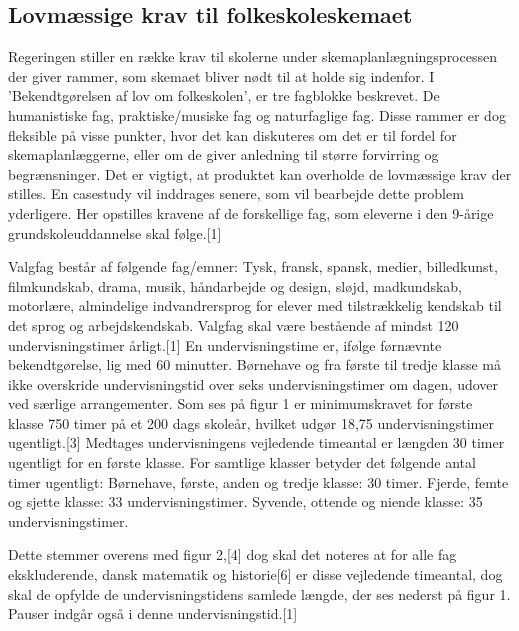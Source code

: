 \subsection{Lovmæssige krav til folkeskoleskemaet}
Regeringen stiller en række krav til skolerne under skemaplanlægningsprocessen der giver rammer, som skemaet bliver nødt til at holde sig indenfor. I 'Bekendtgørelsen af lov om folkeskolen', er tre fagblokke beskrevet. De humanistiske fag, praktiske/musiske fag og naturfaglige fag. Disse rammer er dog fleksible på visse punkter, hvor det kan diskuteres om det er til fordel for skemaplanlæggerne, eller om de giver anledning til større forvirring og begrænsninger. Det er vigtigt, at produktet kan overholde de lovmæssige krav der stilles. En casestudy vil inddrages senere, som vil bearbejde dette problem yderligere. Her opstilles kravene af de forskellige fag, som eleverne i den 9-årige grundskoleuddannelse skal følge.[1]

 Valgfag består af følgende fag/emner: Tysk, fransk, spansk, medier, billedkunst, filmkundskab, drama, musik, håndarbejde og design, sløjd, madkundskab, motorlære, almindelige indvandrersprog for elever med tilstrækkelig kendskab til det sprog og arbejdskendskab.
Valgfag skal være bestående af mindst 120 undervisningstimer årligt.[1]
En undervisningstime er, ifølge førnævnte bekendtgørelse, lig med 60 minutter. Børnehave og fra første til tredje klasse må ikke overskride undervisningstid over seks undervisningstimer om dagen, udover ved særlige arrangementer.
Som ses på figur 1 er minimumskravet for første klasse 750 timer på et 200 dags skoleår, hvilket udgør 18,75 undervisningstimer ugentligt.[3]
Medtages undervisningens vejledende timeantal er længden 30 timer ugentligt for en første klasse. For samtlige klasser betyder det følgende antal timer ugentligt:
Børnehave, første, anden og tredje klasse: 30 timer.
Fjerde, femte og sjette klasse: 33 undervisningstimer.
Syvende, ottende og niende klasse: 35 undervisningstimer.

Dette stemmer overens med figur 2,[4] dog skal det noteres at for alle fag ekskluderende, dansk matematik og historie[6] er disse vejledende timeantal, dog skal de opfylde de undervisningstidens samlede længde, der ses nederst på figur 1. Pauser indgår også i denne undervisningstid.[1]
 	
